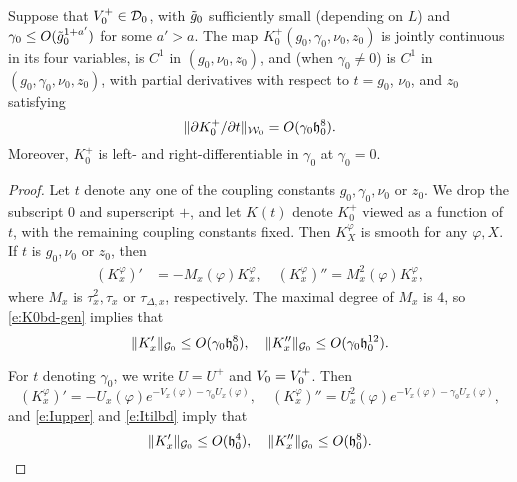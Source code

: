 \begin{prop}
\label{prop:Ksmooth}
Suppose that $V_0^+ \in \mathcal{D}_0$, with $\tilde{g}_0$ sufficiently small
(depending on $L$) and $\gamma_0 \le O(\tilde{g}_0^{1+a'})$
for some $a' >a$.
The map $K^+_0(g_0, \gamma_0, \nu_0, z_0)$ is jointly continuous
in its four variables, is
$C^1$ in $(g_0, \nu_0, z_0)$,
and (when $\gamma_0 \ne 0$) is $C^1$ in $(g_0, \gamma_0, \nu_0, z_0)$,
with partial derivatives with respect to $t = g_0$, $\nu_0$, and $z_0$ satisfying
\begin{equation}
\label{e:ddpK}
\|\partial K^+_0 / \partial t\|_{\mathcal{W}_0} = O(\gamma_0 \mathfrak{h}_0^8).
\end{equation}
Moreover, $K^+_0$
is left- and right-differentiable in $\gamma_0$ at $\gamma_0 = 0$.
\end{prop}

\begin{proof}
Let $t$ denote any one of the coupling constants $g_0, \gamma_0, \nu_0$ or $z_0$.
We drop the subscript $0$ and superscript $+$, and let $K(t)$ denote $K^+_0$ viewed as a function of $t$,
with the remaining coupling constants fixed. Then $K^\varphi_X$ is smooth for any $\varphi, X$.
If $t$ is $g_0, \nu_0$ or $z_0$, then
\begin{align}
(K^\varphi_x)'  &= -M_x(\varphi) K^\varphi_x, \quad
(K^\varphi_x)'' = M_x^2(\varphi) K^\varphi_x,
\end{align}
where $M_x$ is $\tau_x^2, \tau_x$ or $\tau_{\Delta,x}$, respectively.
The maximal degree of $M_x$ is $4$, so
\eqref{e:K0bd-gen} implies that
\begin{equation}
\label{e:Kprime-bd1}
\|K'_x\|_{\mathcal{G}_0} \le O(\gamma_0 \mathfrak{h}_0^{8}),
  \quad
\|K''_x\|_{\mathcal{G}_0} \le O(\gamma_0 \mathfrak{h}_0^{12}).
\end{equation}

For $t$ denoting $\gamma_0$, we
write $U = U^+$
and $V_0 = V^+_0$.
Then
\begin{equation}
\label{e:dKdgamma0}
(K^\varphi_x)'  = -U_x(\varphi) e^{-V_x(\varphi) - \gamma_0 U_x(\varphi)}, \quad
(K^\varphi_x)'' = U_x^2(\varphi) e^{-V_x(\varphi) - \gamma_0 U_x(\varphi)},
\end{equation}
and \eqref{e:Iupper} and \eqref{e:Itilbd} imply that
\begin{equation}
\label{e:Kprime-bd2}
\|K'_x\|_{\mathcal{G}_0} \le O(\mathfrak{h}_0^4),
  \quad
\|K''_x\|_{\mathcal{G}_0} \le O(\mathfrak{h}_0^8).
\end{equation}


\end{proof}
